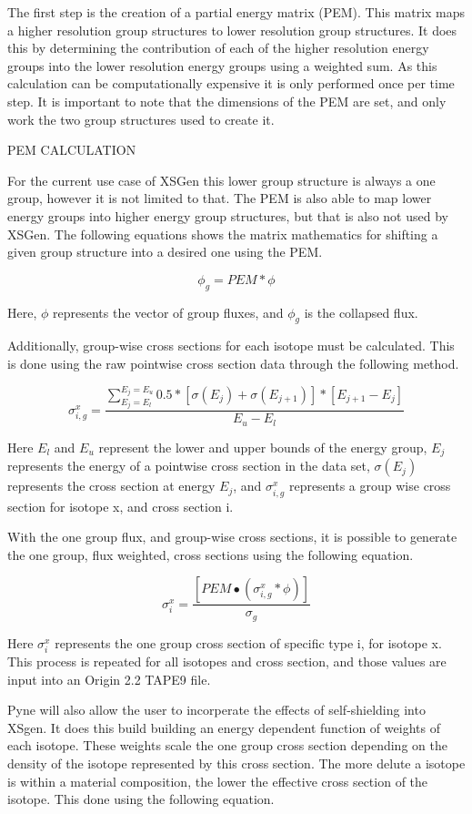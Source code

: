 \documentclass{article}
\begin{document}
The first step is the creation of a partial energy matrix (PEM). This matrix maps a higher resolution group structures to lower resolution group structures. It does this by determining the contribution of each of the higher resolution energy groups into the lower resolution energy groups using a weighted sum. As this calculation can be computationally expensive it is only performed once per time step. It is important to note that the dimensions of the PEM are set, and only work the two group structures used to create it.

PEM CALCULATION

For the current use case of XSGen this lower group structure is always a one group, however it is not limited to that. The PEM is also able to map lower energy groups into higher energy group structures, but that is also not used by XSGen. The following equations shows the matrix mathematics for shifting a given group structure into a desired one using the PEM.

$$\phi_g = PEM * \phi$$

Here, $\phi$ represents the vector of group fluxes, and $\phi_g$ is the collapsed flux.

Additionally, group-wise cross sections for each isotope must be calculated. This is done using the raw pointwise cross section data through the following method.

$$\sigma_{i,g}^x = \frac{\sum_{E_j=E_l}^{E_j=E_u}0.5*[\sigma(E_j)+\sigma(E_{j+1})]*[E_{j+1}-E_{j}]}{E_u-E_l}$$

Here $E_l$ and $E_u$ represent the lower and upper bounds of the energy group, $E_j$ represents the energy of a pointwise cross section in the data set, $\sigma(E_j)$ represents the cross section at energy $E_j$, and $\sigma_{i,g}^x$ represents a group wise cross section for isotope x, and cross section i.

With the one group flux, and group-wise cross sections, it is possible to generate the one group, flux weighted, cross sections using the following equation.

$$\sigma_{i}^x=\frac{[PEM∙(\sigma_{i,g}^x*\phi)]}{\sigma_g}$$

Here $\sigma_{i}^x$ represents the one group cross section of specific type i, for isotope x. This process is repeated for all isotopes and cross section, and those values are input into an Origin 2.2 TAPE9 file.

Pyne will also allow the user to incorperate the effects of self-shielding into XSgen. It does this build building an energy dependent function of weights of each isotope. These weights scale the one group cross section depending on the density of the isotope represented by this cross section. The more delute a isotope is within a material composition, the lower the effective cross section of the isotope. This done using the following equation.
\end{document}
